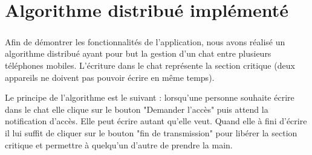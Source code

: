 \documentclass[a4paper,10pt]{report}
\begin{document}
    
    
    
  \paragraph{}

\chapter{Algorithme distribué implémenté}
\paragraph{}
Afin de démontrer les fonctionnalités de l'application, nous avons réalisé un algorithme distribué ayant pour but la gestion d'un chat entre plusieurs téléphones mobiles. L'écriture dans le chat représente la section critique (deux appareils ne doivent pas pouvoir écrire  en même temps).

Le principe de l'algorithme est le suivant : lorsqu'une personne souhaite écrire dans le chat elle clique sur le bouton "Demander l'accès" puis attend la notification d'accès.
Elle peut écrire autant qu'elle veut.
Quand elle à fini d'écrire il lui suffit de cliquer sur le bouton "fin de transmission" pour libérer la section critique et permettre à quelqu'un d'autre de prendre la main.
\end{document}
